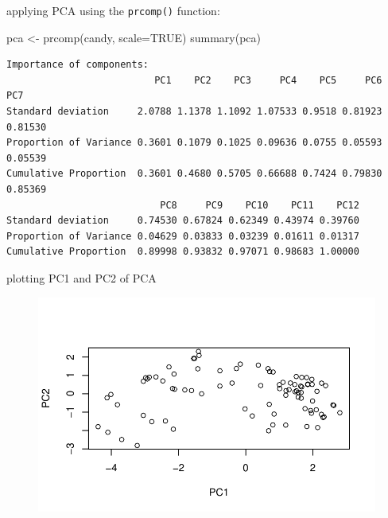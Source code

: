 \documentclass[
  letterpaper,
  DIV=11,
  numbers=noendperiod]{scrartcl}
\newenvironment{Shaded}{\begin{snugshade}}{\end{snugshade}}
\newcommand{\AttributeTok}[1]{\textcolor[rgb]{0.40,0.45,0.13}{#1}}
\newcommand{\ConstantTok}[1]{\textcolor[rgb]{0.56,0.35,0.01}{#1}}
\newcommand{\FunctionTok}[1]{\textcolor[rgb]{0.28,0.35,0.67}{#1}}
\newcommand{\NormalTok}[1]{\textcolor[rgb]{0.00,0.23,0.31}{#1}}
\newcommand{\OtherTok}[1]{\textcolor[rgb]{0.00,0.23,0.31}{#1}}
\newcommand{\SpecialCharTok}[1]{\textcolor[rgb]{0.37,0.37,0.37}{#1}}
\begin{document}
applying PCA using the \texttt{prcomp()} function:

\begin{Shaded}
\begin{Highlighting}[]
\NormalTok{pca }\OtherTok{\textless{}{-}} \FunctionTok{prcomp}\NormalTok{(candy, }\AttributeTok{scale=}\ConstantTok{TRUE}\NormalTok{)}
\FunctionTok{summary}\NormalTok{(pca)}
\end{Highlighting}
\end{Shaded}

\begin{verbatim}
Importance of components:
                          PC1    PC2    PC3     PC4    PC5     PC6     PC7
Standard deviation     2.0788 1.1378 1.1092 1.07533 0.9518 0.81923 0.81530
Proportion of Variance 0.3601 0.1079 0.1025 0.09636 0.0755 0.05593 0.05539
Cumulative Proportion  0.3601 0.4680 0.5705 0.66688 0.7424 0.79830 0.85369
                           PC8     PC9    PC10    PC11    PC12
Standard deviation     0.74530 0.67824 0.62349 0.43974 0.39760
Proportion of Variance 0.04629 0.03833 0.03239 0.01611 0.01317
Cumulative Proportion  0.89998 0.93832 0.97071 0.98683 1.00000
\end{verbatim}

plotting PC1 and PC2 of PCA

\begin{Shaded}
\end{Shaded}

\begin{figure}[H]

{\centering \includegraphics{class10_project_files/figure-pdf/unnamed-chunk-20-1.pdf}

}

\end{figure}
\end{document}
